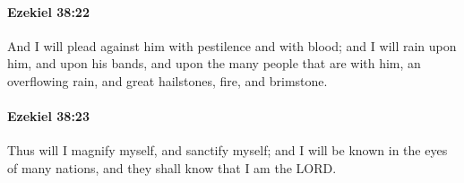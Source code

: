 		\paragraph{Ezekiel 38:22} %
			\label{EZEKIEL-38-22}

			And I will plead against him with pestilence and with blood; and I will rain upon him, and upon his bands, and upon the many people that are with him, an overflowing rain, and great hailstones, fire, and brimstone.


		\paragraph{Ezekiel 38:23} %
			\label{EZEKIEL-38-23}

			Thus will I magnify myself, and sanctify myself; and I will be known in the eyes of many nations, and they shall know that I am the LORD.

